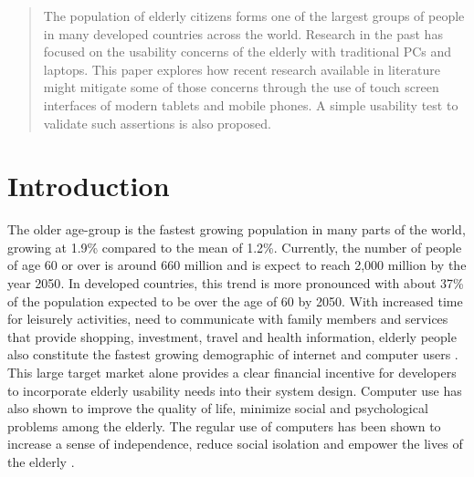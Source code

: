 \documentclass[12pt,draftcls,onecolumn]{IEEEtran}
\begin{document}
\begin{abstract}
The population of elderly citizens forms one of the largest groups of people in many developed countries across the world. Research in the past has focused on the usability concerns of the elderly with traditional PCs and laptops. This paper explores how recent research available in literature might mitigate some of those concerns through the use of touch screen interfaces of modern tablets and mobile phones. A simple usability test to validate such assertions is also proposed.


\end{abstract}





%
\IEEEpeerreviewmaketitle



\section{Introduction}
The older age-group is the fastest growing population in many parts of the world, growing at 1.9\% compared to the mean of 1.2\%. Currently, the number of people of age 60 or over is around 660 million and is expect to reach 2,000 million by the year 2050\cite{UN}. In developed countries, this trend is more pronounced with about 37\% of the population expected to be over the age of 60 by 2050.  With increased time for leisurely activities, need to communicate with family members and services that provide shopping, investment, travel and health information, elderly people also constitute the fastest growing demographic of internet and computer users \cite{hanson2001web}. This large target market alone provides a clear financial incentive for developers to incorporate elderly usability needs into their system design. Computer use has also shown to improve the quality of life, minimize social and psychological problems among the elderly\cite{karavidas2005effects}. The regular use of computers has been shown to increase a sense of independence, reduce social isolation and empower the lives of the elderly \cite{wolf2010elderly}. 
\end{document}
